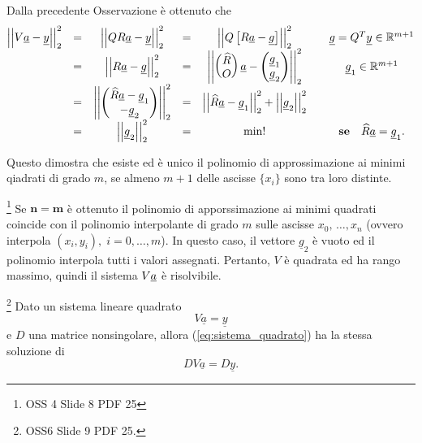Dalla precedente Osservazione è ottenuto che
\begin{equation*}
	\begin{matrix}
		\left|\left|V \uline a - \uline y\right|\right|^2_2 &=& \left|\left|QR\uline a - \uline y\right|\right|^2_2 &=& \left|\left|Q\left[R\uline a -  \uline g\right]\right|\right|_2^2 && \uline g = Q^T\uline y\in\mathbb{R}^{m+1}\\
		&=&\left|\left|R\uline a -\uline g\right|\right|_2^2 &=& 
		\left|\left|\begin{pmatrix}
			\widehat{R}\\
			O
		\end{pmatrix}\uline a -
		\begin{pmatrix}
			\uline g_1\\
			\uline g_2
		\end{pmatrix}\right|\right|_2^2 && \uline g_1\in\mathbb{R}^{m+1}\\
		&=& \left|\left| \begin{pmatrix}
			\widehat{R}\uline a - \uline g_1\\
			- \uline g_2
		\end{pmatrix}\right|\right|_2^2 &=& \left|\left|\widehat{R}\uline a - \uline g_1 \right|\right|_2^2 + \left|\left|\uline g_2\right|\right|_2^2\\
		&=& \left|\left|\uline g_2\right|\right|_2^2 &=& \min! &&  \text{\textbf{se}}\quad \widehat{R} \uline a = \uline g_1.
	\end{matrix}
\end{equation*}

Questo dimostra che esiste ed è unico il polinomio di approssimazione ai minimi qiadrati di grado $m$, se almeno $m+1$ delle ascisse $\{x_i\}$ sono tra loro distinte.

\begin{remark}
    \footnote{OSS 4 Slide 8 PDF 25}
    Se $\boldsymbol{n=m}$ è ottenuto il polinomio di apporssimazione ai minimi quadrati coincide con il polinomio interpolante di grado $m$ sulle ascisse $x_0,\, \hdots, x_n$ (ovvero interpola $(x_i,y_i),\; i=0,\hdots, m$). In questo caso, il vettore $\underline g_2$ è vuoto ed il polinomio interpola tutti i valori assegnati. Pertanto, $V$ è quadrata ed ha rango massimo, quindi il sistema $V\uline a$ è risolvibile.
\end{remark}

\begin{remark}
	\footnote{OSS6 Slide 9 PDF 25.} Dato un sistema lineare quadrato
	\begin{equation}\label{eq:sistema_quadrato}
		V\underline{a}=\underline{y}
	\end{equation}
	e $D$ una matrice nonsingolare, allora (\ref{eq:sistema_quadrato}) ha la stessa soluzione di
	\begin{equation}\label{eq:sistema_quadrato_2}
		DV\underline{a}=D\underline{y}.
	\end{equation}
\end{remark}

